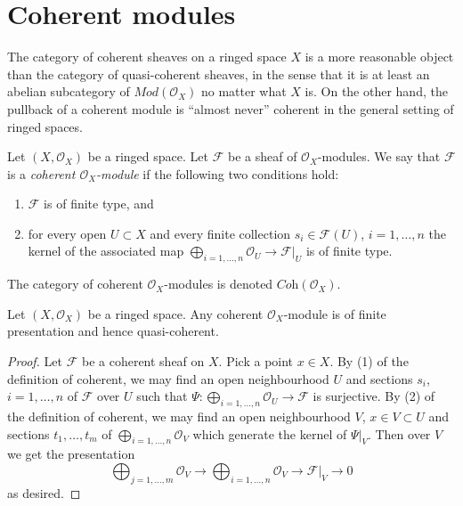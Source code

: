 \section{Coherent modules}
\label{section-coherent}

\noindent
The category of coherent sheaves on a ringed space $X$
is a more reasonable object
than the category of quasi-coherent sheaves, in the sense
that it is at least an abelian subcategory of $\textit{Mod}(\mathcal{O}_X)$
no matter what $X$ is. On the other hand, the pullback of a
coherent module is ``almost never'' coherent in the general setting
of ringed spaces.

\begin{definition}
\label{definition-coherent}
Let $(X, \mathcal{O}_X)$ be a ringed space.
Let $\mathcal{F}$ be a sheaf of $\mathcal{O}_X$-modules.
We say that $\mathcal{F}$ is a {\it coherent $\mathcal{O}_X$-module}
if the following two conditions hold:
\begin{enumerate}
\item $\mathcal{F}$ is of finite type, and
\item for every open $U \subset X$ and every finite
collection $s_i \in \mathcal{F}(U)$, $i = 1, \ldots, n$
the kernel of the associated map
$\bigoplus_{i = 1, \ldots, n} \mathcal{O}_U \to \mathcal{F}|_U$
is of finite type.
\end{enumerate}
The category of coherent $\mathcal{O}_X$-modules is denoted
$\textit{Coh}(\mathcal{O}_X)$.
\end{definition}

\begin{lemma}
\label{lemma-coherent-finite-presentation}
Let $(X, \mathcal{O}_X)$ be a ringed space.
Any coherent $\mathcal{O}_X$-module is of finite presentation
and hence quasi-coherent.
\end{lemma}

\begin{proof}
Let $\mathcal{F}$ be a coherent sheaf on $X$.
Pick a point $x \in X$.
By (1) of the definition of coherent, we may find an open neighbourhood $U$
and sections $s_i$, $i = 1, \ldots, n$ of $\mathcal{F}$ over $U$
such that $\Psi : \bigoplus_{i = 1, \ldots, n} \mathcal{O}_U \to \mathcal{F}$
is surjective. By (2) of the definition of coherent, we may find
an open neighbourhood $V$, $x \in V \subset U$ and sections
$t_1, \ldots, t_m$ of $\bigoplus_{i = 1, \ldots, n} \mathcal{O}_V$
which generate the kernel of $\Psi|_V$. Then over $V$ we get the
presentation
$$
\bigoplus\nolimits_{j = 1, \ldots, m}
\mathcal{O}_V
\longrightarrow
\bigoplus\nolimits_{i = 1, \ldots, n}
\mathcal{O}_V
\to
\mathcal{F}|_V
\to
0
$$
as desired.
\end{proof}

